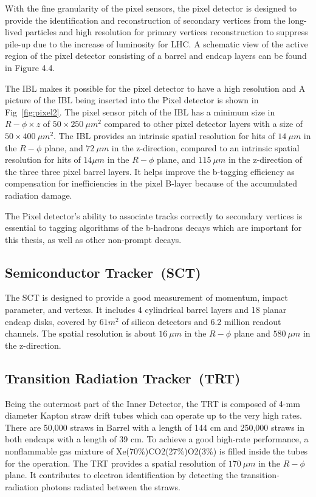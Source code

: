 \par With the fine granularity of the pixel sensors, the pixel detector is designed to provide the identification and reconstruction of secondary vertices from the long-lived particles and high resolution for primary vertices reconstruction to suppress pile-up due to the increase of luminosity for LHC. A schematic view of the active region of the pixel detector consisting of a barrel and endcap layers can be found in Figure 4.4.
\par The IBL makes it possible for the pixel detector to have a high resolution and A picture of the IBL being inserted into the Pixel detector is shown in 
Fig~\ref{fig:pixel2}. The pixel sensor pitch of the IBL has a minimum size in $R-\phi \times z$ of $50 \times 250~\mu m^2$ compared to other pixel detector layers with a size of $50 \times 400~\mu m^2$. 	 The IBL provides an intrinsic spatial resolution for hits of $14~\mu m$ in the $R-\phi$ plane, and
$72~\mu m$ in the z-direction, compared to an intrinsic spatial resolution for hits of $14\mu m$ in the $R-\phi$ plane, and $115~\mu m$ in the z-direction of the three three pixel barrel layers.
It helps improve the b-tagging efficiency as compensation for inefficiencies in the pixel B-layer because of the accumulated radiation damage.
\par The Pixel detector's ability to associate tracks correctly to secondary vertices is essential to tagging algorithms of the b-hadrons decays which are important for this thesis, as well as other non-prompt decays.
\subsection{Semiconductor Tracker~(SCT)}
The SCT is designed to provide a good measurement of momentum, impact parameter, and vertexs. It includes 4 cylindrical barrel layers and 18 planar endcap disks, covered by $61 m^2$ of silicon detectors and 6.2 million readout channels. The spatial resolution is about $16~\mu m$ in the $R-\phi$ plane and $580~\mu m$ in the z-direction.

\subsection{Transition Radiation Tracker~(TRT)}

Being the outermost part of the Inner Detector, the TRT is composed of 4-mm diameter Kapton straw drift tubes which can operate up to the very high rates. There are 50,000 straws in Barrel with a length of 144 cm and 250,000 straws in both endcaps with a length of 39 cm.
To achieve a good high-rate performance, a nonflammable gas mixture of Xe(70\%)CO2(27\%)O2(3\%) is filled inside the tubes for the operation. The TRT provides a spatial resolution of $170~\mu m$ in the $R-\phi$ plane. It contributes to electron identification by detecting the transition-radiation photons radiated between the straws. 

